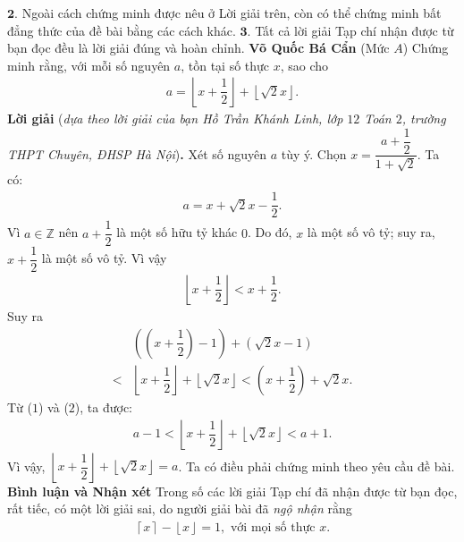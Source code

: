 \begin{multicols}{2}
	\vskip 0.05cm
	$\pmb{2.}$ Ngoài cách chứng minh được nêu ở Lời giải trên, còn có thể chứng minh bất đẳng thức của đề bài bằng các cách khác.
	\vskip 0.05cm
	$\pmb{3.}$ Tất cả lời giải Tạp chí nhận được từ bạn đọc đều là lời giải đúng và hoàn chỉnh.
	\vskip 0.15cm
	\hfill	\textbf{\color{thachthuctoanhoc}Võ Quốc Bá Cẩn}
	\vskip 0.15cm
	{}
	(Mức $A$) Chứng minh rằng, với mỗi số nguyên $a$, tồn tại số thực $x$, sao cho  
	\begin{align*}
		a=\left\lfloor x +\dfrac12\right\rfloor+\left\lfloor\sqrt{2}x\right\rfloor.
	\end{align*}
	\textbf{\color{thachthuctoanhoc}Lời giải} (\textit{dựa theo lời giải của bạn Hồ Trần Khánh Linh, lớp $12$ Toán $2$, trường THPT Chuyên, ĐHSP Hà Nội})\textbf{\color{thachthuctoanhoc}.}
	\vskip 0.05cm
	Xét số nguyên $a$ tùy ý. Chọn $x = \dfrac{{a + \dfrac{1}{2}}}{{1 + \sqrt 2 }}.$  Ta có:
	\begin{align*}
		a = x + \sqrt 2 x - \dfrac{1}{2}. \tag{$1$}
	\end{align*}
	Vì $a \in \mathbb{Z}$  nên $a + \dfrac{1}{2}$ là một số hữu tỷ khác $0$. Do đó, $x$ là một số vô tỷ; suy ra, $x + \dfrac{1}{2}$ là một số vô tỷ. Vì vậy
	\begin{align*}
		\left\lfloor {x + \dfrac{1}{2}} \right\rfloor < x + \dfrac{1}{2}.
	\end{align*}
	Suy ra
	\begin{align*}
		&\left( {\left( {x + \dfrac{1}{2}} \right) - 1} \right) + \left( {\sqrt 2 x - 1} \right) \\
		< &\left\lfloor {x \!+\! \dfrac{1}{2}} \right\rfloor \!+\! \left\lfloor {\sqrt 2 x} \right\rfloor \!<\! \left( {x \!+\! \dfrac{1}{2}} \right) \!+\! \sqrt 2 x. \tag{$2$}
	\end{align*}
	Từ ($1$) và ($2$), ta được:
	\begin{align*}
		a - 1 < \left\lfloor {x + \dfrac{1}{2}} \right\rfloor + \left\lfloor {\sqrt 2 x} \right\rfloor < a + 1.
	\end{align*}
	Vì vậy, $\left\lfloor {x + \dfrac{1}{2}} \right\rfloor + \left\lfloor {\sqrt 2 x} \right\rfloor = a$.
	\vskip 0.05cm   
	Ta có điều phải chứng minh theo yêu cầu đề bài.
	\vskip 0.05cm
	\textbf{\color{thachthuctoanhoc}Bình luận và Nhận xét}
	\vskip 0.05cm
	Trong số các lời giải Tạp chí đã nhận được từ bạn đọc, rất tiếc, có một lời giải sai, do người giải bài đã \textit{ngộ nhận} rằng
	\begin{align*}
		 \left\lceil x \right\rceil  - \left\lfloor x \right\rfloor = 1, \text{ với mọi số thực } x.

\end{align*}
\end{multicols}
